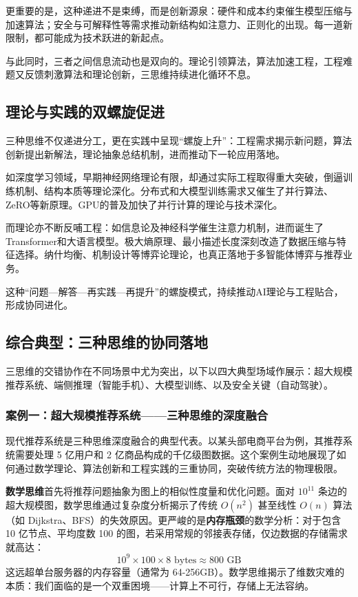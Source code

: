 更重要的是，这种递进不是束缚，而是创新源泉：硬件和成本约束催生模型压缩与加速算法；安全与可解释性等需求推动新结构如注意力、正则化的出现。每一道新限制，都可能成为技术跃进的新起点。

与此同时，三者之间信息流动也是双向的。理论引领算法，算法加速工程，工程难题又反馈刺激算法和理论创新，三思维持续进化循环不息。

\subsection{理论与实践的双螺旋促进}

三种思维不仅递进分工，更在实践中呈现“螺旋上升”：工程需求揭示新问题，算法创新提出新解法，理论抽象总结机制，进而推动下一轮应用落地。

如深度学习领域，早期神经网络理论有限，却通过实际工程取得重大突破，倒逼训练机制、结构本质等理论深化。分布式和大模型训练需求又催生了并行算法、ZeRO等新原理。GPU的普及加快了并行计算的理论与技术深化。

而理论亦不断反哺工程：如信息论及神经科学催生注意力机制，进而诞生了Transformer和大语言模型。极大熵原理、最小描述长度深刻改造了数据压缩与特征选择。纳什均衡、机制设计等博弈论理论，也真正落地于多智能体博弈与推荐业务。

这种“问题—解答—再实践—再提升”的螺旋模式，持续推动AI理论与工程贴合，形成协同进化。

\subsection{综合典型：三种思维的协同落地}

三思维的交错协作在不同场景中尤为突出，以下以四大典型场域作展示：超大规模推荐系统、端侧推理（智能手机）、大模型训练、以及安全关键（自动驾驶）。

\subsubsection{案例一：超大规模推荐系统——三种思维的深度融合}

现代推荐系统是三种思维深度融合的典型代表。以某头部电商平台为例，其推荐系统需要处理 5 亿用户和 2 亿商品构成的千亿级图数据。这个案例生动地展现了如何通过数学理论、算法创新和工程实践的三重协同，突破传统方法的物理极限。

\textbf{数学思维}首先将推荐问题抽象为图上的相似性度量和优化问题。面对 $10^{11}$ 条边的超大规模图，数学思维通过复杂度分析揭示了传统 $O(n^2)$ 甚至线性 $O(n)$ 算法（如 Dijkstra、BFS）的失效原因。更严峻的是\textbf{内存瓶颈}的数学分析：对于包含 10 亿节点、平均度数 100 的图，若采用常规的邻接表存储，仅边数据的存储需求就高达：
$$10^9 \times 100 \times 8 \text{ bytes} \approx 800 \text{ GB}$$
这远超单台服务器的内存容量（通常为 64-256GB）。数学思维揭示了维数灾难的本质：我们面临的是一个双重困境——计算上不可行，存储上无法容纳。

